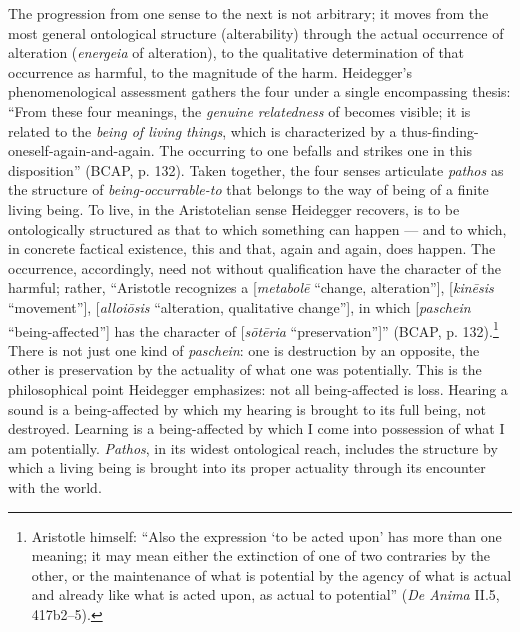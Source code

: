 The progression from one sense to the next is not arbitrary; it moves from the most general ontological structure (alterability) through the actual occurrence of alteration (\textit{energeia} of alteration), to the qualitative determination of that occurrence as harmful, to the magnitude of the harm. Heidegger's phenomenological assessment gathers the four under a single encompassing thesis: ``From these four meanings, the \textit{genuine relatedness} of  becomes visible; it is related to the \textit{being of living things}, which is characterized by a thus-finding-oneself-again-and-again. The occurring to one befalls and strikes one in this disposition'' (BCAP, p. 132). Taken together, the four senses articulate \textit{pathos} as the structure of \textit{being-occurrable-to} that belongs to the way of being of a finite living being. To live, in the Aristotelian sense Heidegger recovers, is to be ontologically structured as that to which something can happen --- and to which, in concrete factical existence, this and that, again and again, does happen. The occurrence, accordingly, need not without qualification have the character of the harmful; rather, ``Aristotle recognizes a  [\textit{metabolē} ``change, alteration''],  [\textit{kinēsis} ``movement''],  [\textit{alloiōsis} ``alteration, qualitative change''], in which  [\textit{paschein} ``being-affected''] has the character of  [\textit{sōtēria} ``preservation'']'' (BCAP, p. 132).\footnote{Aristotle himself: ``Also the expression `to be acted upon' has more than one meaning; it may mean either the extinction of one of two contraries by the other, or the maintenance of what is potential by the agency of what is actual and already like what is acted upon, as actual to potential'' (\textit{De Anima} II.5, 417b2--5).} There is not just one kind of \textit{paschein}: one is destruction by an opposite, the other is preservation by the actuality of what one was potentially. This is the philosophical point Heidegger emphasizes: not all being-affected is loss. Hearing a sound is a being-affected by which my hearing is brought to its full being, not destroyed. Learning is a being-affected by which I come into possession of what I am potentially. \textit{Pathos}, in its widest ontological reach, includes the structure by which a living being is brought into its proper actuality through its encounter with the world.

